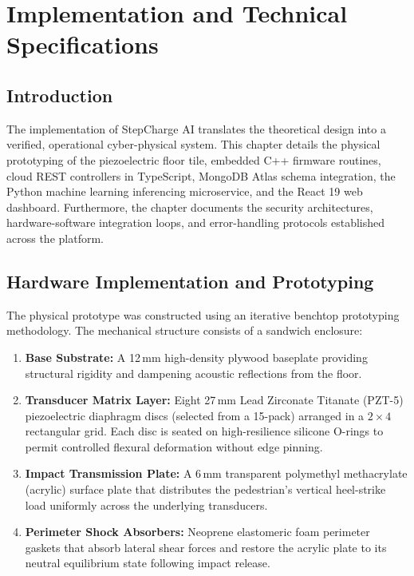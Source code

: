 \chapter{Implementation and Technical Specifications}

\section{Introduction}
The implementation of StepCharge AI translates the theoretical design into a verified, operational cyber-physical system. This chapter details the physical prototyping of the piezoelectric floor tile, embedded C++ firmware routines, cloud REST controllers in TypeScript, MongoDB Atlas schema integration, the Python machine learning inferencing microservice, and the React 19 web dashboard. Furthermore, the chapter documents the security architectures, hardware-software integration loops, and error-handling protocols established across the platform.

\section{Hardware Implementation and Prototyping}
The physical prototype was constructed using an iterative benchtop prototyping methodology. The mechanical structure consists of a sandwich enclosure:
\begin{enumerate}
    \item \textbf{Base Substrate:} A 12\,mm high-density plywood baseplate providing structural rigidity and dampening acoustic reflections from the floor.
    \item \textbf{Transducer Matrix Layer:} Eight 27\,mm Lead Zirconate Titanate (PZT-5) piezoelectric diaphragm discs (selected from a 15-pack) arranged in a $2 \times 4$ rectangular grid. Each disc is seated on high-resilience silicone O-rings to permit controlled flexural deformation without edge pinning.
    \item \textbf{Impact Transmission Plate:} A 6\,mm transparent polymethyl methacrylate (acrylic) surface plate that distributes the pedestrian's vertical heel-strike load uniformly across the underlying transducers.
    \item \textbf{Perimeter Shock Absorbers:} Neoprene elastomeric foam perimeter gaskets that absorb lateral shear forces and restore the acrylic plate to its neutral equilibrium state following impact release.
\end{enumerate}


